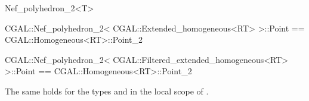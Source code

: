 \begin{ccRefClass}{Nef_polyhedron_2<T>}
\begin{ccExampleCode}
CGAL::Nef_polyhedron_2< CGAL::Extended_homogeneous<RT> >::Point
   == CGAL::Homogeneous<RT>::Point_2

CGAL::Nef_polyhedron_2< CGAL::Filtered_extended_homogeneous<RT> >::Point
   == CGAL::Homogeneous<RT>::Point_2
\end{ccExampleCode}
The same holds for the types  and  in the
local scope of .

\end{ccRefClass}


